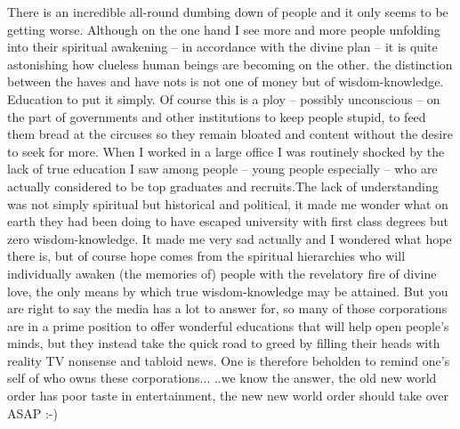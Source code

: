 \begin{footnotesize}
\begin{sffamily}
There is an incredible all-round dumbing down of people and it only seems to be getting worse. Although on the one hand I see more and more people unfolding into their spiritual awakening -- in accordance with the divine plan -- it is quite astonishing how clueless human beings are becoming on the other. the distinction between the haves and have nots is not one of money but of wisdom-knowledge. Education to put it simply. Of course this is a ploy -- possibly unconscious -- on the part of governments and other institutions to keep people stupid, to feed them bread at the circuses so they remain bloated and content without the desire to seek for more. When I worked in a large office I was routinely shocked by the lack of true education I saw among people -- young people especially -- who are actually considered to be top graduates and recruits.The lack of understanding was not simply spiritual but historical and political, it made me wonder what on earth they had been doing to have escaped university with first class degrees but zero wisdom-knowledge. It made me very sad actually and I wondered what hope there is, but of course hope comes from the spiritual hierarchies who will individually awaken (the memories of) people with the revelatory fire of divine love, the only means by which true wisdom-knowledge may be attained. But you are right to say the media has a lot to answer for, so many of those corporations are in a prime position to offer wonderful educations that will help open people's minds, but they instead take the quick road to greed by filling their heads with reality TV nonsense and tabloid news. One is therefore beholden to remind one's self of who owns these corporations... ..we know the answer, the old new world order has poor taste in entertainment, the new new world order should take over ASAP :-)

\hfill

\end{sffamily}
\end{footnotesize}

